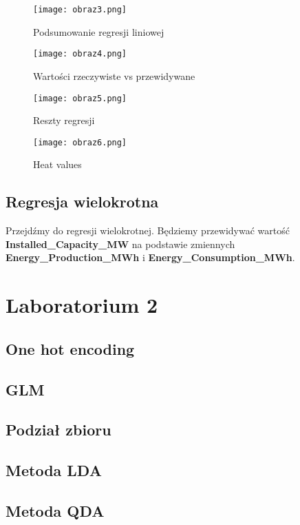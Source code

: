 \documentclass{article}
\begin{document}
\begin{figure}[H]
    \centering
    \texttt{[image: obraz3.png]}
    \caption{Podsumowanie regresji liniowej}
    \label{fig:summary}
\end{figure}

\begin{figure}[H]
    \centering
    \texttt{[image: obraz4.png]}
    \caption{Wartości rzeczywiste vs przewidywane}
    \label{fig:real_vs_predicted}
\end{figure}

\begin{figure}[H]
    \centering
    \texttt{[image: obraz5.png]}
    \caption{Reszty regresji}
    \label{fig:residuals}
\end{figure}

\begin{figure}[H]
    \centering
    \texttt{[image: obraz6.png]}
    \caption{Heat values}
    \label{fig:heat_values}
\end{figure}

\subsection{Regresja wielokrotna}
Przejdźmy do regresji wielokrotnej. Będziemy przewidywać wartość \textbf{Installed\_Capacity\_MW} na podstawie zmiennych \textbf{Energy\_Production\_MWh} i \textbf{Energy\_Consumption\_MWh}.

\section{Laboratorium 2}
\subsection{One hot encoding}
\subsection{GLM}
\subsection{Podział zbioru}
\subsection{Metoda LDA}
\subsection{Metoda QDA}
\end{document}
